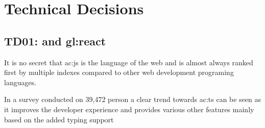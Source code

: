 \section{Technical Decisions}

\subsection{TD01:  and \gls{gl:react}}\label{abtd:01}


It is no secret that \gls{ac:js} is the language of the web and is almost always ranked first by multiple indexes compared to other web development programing languages.


In a survey conducted on 39,472 person a clear trend towards \gls{ac:ts} can be seen as it improves the developer experience and provides various other features mainly based on the added typing support \citep{TheStateOfJs}

